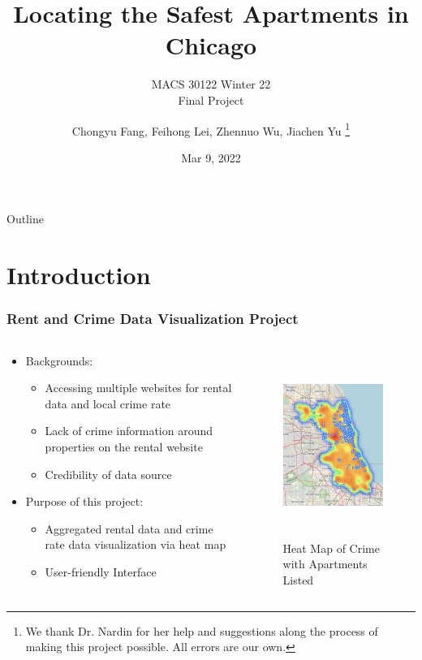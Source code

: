 \documentclass{beamer}
\title{\textbf{Locating the Safest Apartments in Chicago}}
\subtitle{MACS 30122 Winter 22\\Final Project}
\author{Chongyu Fang, Feihong Lei, Zhennuo Wu, Jiachen Yu \thanks{We thank Dr. Nardin for her help and suggestions along the process of making this project possible. All errors are our own.}}
\institute{The University of Chicago}
\date{Mar 9, 2022}
\begin{document}
	\maketitle
	
\begin{frame}{Outline}
    \tableofcontents
\end{frame}


\section{Introduction}

\begin{frame}
	\frametitle{Rent and Crime Data Visualization Project}

	\begin{columns}
		\begin{column}{0.5\textwidth}
			\begin{itemize}
				\item Backgrounds:
				\begin{itemize}
					\item Accessing multiple websites for rental data and local crime rate
					\item Lack of crime information around properties on the rental website
					\item Credibility of data source
				\end{itemize}
				\item Purpose of this project:
				\begin{itemize}
					\item Aggregated rental data and crime rate data visualization via heat map
					\item User-friendly Interface
				\end{itemize}
			\end{itemize}
		\end{column}
	
		\begin{column}{0.5\textwidth}
			\begin{figure}[H]
				\centering
				\includegraphics[height=6cm, width=4.8cm]{figs/intro_display.jpeg}
				\caption{Heat Map of Crime with Apartments Listed}
			\end{figure}
		\end{column}
	\end{columns}
\end{frame}
\end{document}
